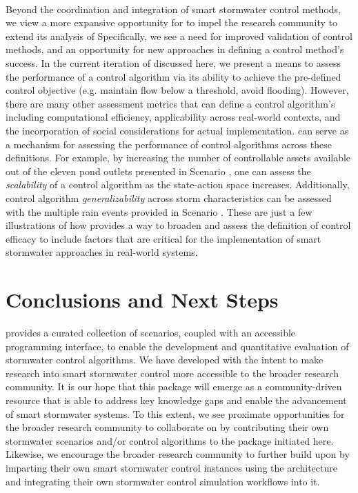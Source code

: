 \

Beyond the coordination and integration of smart stormwater control methods, we view a more expansive opportunity for \pystorms to impel the research community to extend its analysis of  Specifically, we see a need for improved validation of control methods, and an opportunity for new approaches in defining a control method's success. In the current iteration of \pystorms discussed here, we present a means to assess the performance of a control algorithm via its ability to achieve the pre-defined control objective (e.g. maintain flow below a threshold, avoid flooding). However, there are many other assessment metrics that can define a control algorithm's  including computational efficiency, applicability across real-world contexts, and the incorporation of social considerations for actual implementation.
\pystorms can serve as a mechanism for assessing the performance of control algorithms across these definitions. For example, by increasing the number of controllable assets available out of the eleven pond outlets presented in Scenario , one can assess the \emph{scalability} of a control algorithm as the state-action space increases. Additionally, control algorithm \emph{generalizability} across storm characteristics can be assessed with the multiple rain events provided in Scenario . These are just a few illustrations of how \pystorms provides a way to broaden and assess the definition of control efficacy to include factors that are critical for the implementation of smart stormwater approaches in real-world systems.
%
%
%
%
%
%
%
%
%
%
%
%
%
%
%
\section{Conclusions and Next Steps}
\label{sec:conclusion}
%
%
%
\pystorms provides a curated collection of scenarios, coupled with an accessible programming interface, to enable the development and quantitative evaluation of stormwater control algorithms. We have developed \pystorms with the intent to make research into smart stormwater control more accessible to the broader research community. It is our hope that this package will emerge as a community-driven resource that is able to address key knowledge gaps and enable the advancement of smart stormwater systems. To this extent, we see proximate opportunities for the broader research community to collaborate on \pystorms by contributing their own stormwater scenarios and/or control algorithms to the package initiated here. Likewise, we encourage the broader research community to further build upon \pystorms by imparting their own smart stormwater control instances using the \pystorms architecture and integrating their own stormwater control simulation workflows into it.


